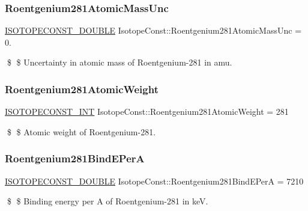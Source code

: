 \subsubsection{\texorpdfstring{Roentgenium281\+Atomic\+Mass\+Unc}{Roentgenium281AtomicMassUnc}}
{\footnotesize\ttfamily \mbox{\hyperlink{group___isotope_const-_macros_ga8f45a7272ce02c0b4c65c44636ed719a}{I\+S\+O\+T\+O\+P\+E\+C\+O\+N\+S\+T\+\_\+\+D\+O\+U\+B\+LE}} Isotope\+Const\+::\+Roentgenium281\+Atomic\+Mass\+Unc = 0.}

\$ \$ Uncertainty in atomic mass of Roentgenium-\/281 in amu. \mbox{\label{group___isotope_const-_roentgenium-_rg281_ga1887699a14b039d3d997f0edcaa4d9c8}} 
\subsubsection{\texorpdfstring{Roentgenium281\+Atomic\+Weight}{Roentgenium281AtomicWeight}}
{\footnotesize\ttfamily \mbox{\hyperlink{group___isotope_const-_macros_ga5f18360b3e99483a35c32d789e62621c}{I\+S\+O\+T\+O\+P\+E\+C\+O\+N\+S\+T\+\_\+\+I\+NT}} Isotope\+Const\+::\+Roentgenium281\+Atomic\+Weight = 281}

\$ \$ Atomic weight of Roentgenium-\/281. \mbox{\label{group___isotope_const-_roentgenium-_rg281_ga0ed16dcd5058d100b16c8d5f82c85d8e}} 
\subsubsection{\texorpdfstring{Roentgenium281\+Bind\+E\+PerA}{Roentgenium281BindEPerA}}
{\footnotesize\ttfamily \mbox{\hyperlink{group___isotope_const-_macros_ga8f45a7272ce02c0b4c65c44636ed719a}{I\+S\+O\+T\+O\+P\+E\+C\+O\+N\+S\+T\+\_\+\+D\+O\+U\+B\+LE}} Isotope\+Const\+::\+Roentgenium281\+Bind\+E\+PerA = 7210}

\$ \$ Binding energy per A of Roentgenium-\/281 in keV. \mbox{\label{group___isotope_const-_roentgenium-_rg281_ga11a3ccbc4131a3afcd54b323461c0257}} 
